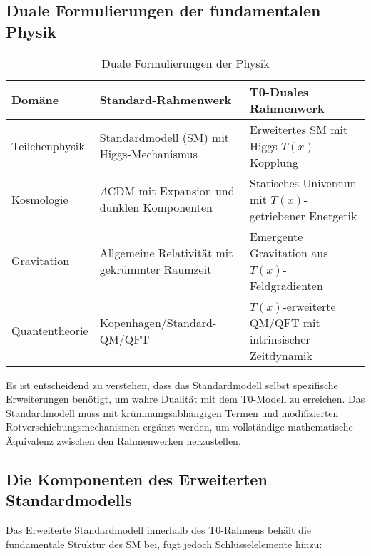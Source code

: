 \documentclass[12pt,a4paper]{article}
\newcommand{\Tfield}{T(x)}
\begin{document}
	\subsection{Duale Formulierungen der fundamentalen Physik}
	
	\begin{table}[h]
		\centering
		\begin{tabular}{>{\RaggedRight}p{} >{\RaggedRight}p{} >{\RaggedRight}p{}}
			\toprule
			\textbf{Domäne} & \textbf{Standard-Rahmenwerk} & \textbf{T0-Duales Rahmenwerk} \\
			\midrule
			Teilchenphysik & Standardmodell (SM) mit Higgs-Mechanismus & Erweitertes SM mit Higgs-$\Tfield$-Kopplung \\
			Kosmologie & $\Lambda$CDM mit Expansion und dunklen Komponenten & Statisches Universum mit $\Tfield$-getriebener Energetik \\
			Gravitation & Allgemeine Relativität mit gekrümmter Raumzeit & Emergente Gravitation aus $\Tfield$-Feldgradienten \\
			Quantentheorie & Kopenhagen/Standard-QM/QFT & $\Tfield$-erweiterte QM/QFT mit intrinsischer Zeitdynamik \\
			\bottomrule
		\end{tabular}
		\caption{Duale Formulierungen der Physik}
	\end{table}
	
	Es ist entscheidend zu verstehen, dass das Standardmodell selbst spezifische Erweiterungen benötigt, um wahre Dualität mit dem T0-Modell zu erreichen. Das Standardmodell muss mit krümmungsabhängigen Termen und modifizierten Rotverschiebungsmechanismen ergänzt werden, um vollständige mathematische Äquivalenz zwischen den Rahmenwerken herzustellen.
	
	\subsection{Die Komponenten des Erweiterten Standardmodells}
	
	Das Erweiterte Standardmodell innerhalb des T0-Rahmens behält die fundamentale Struktur des SM bei, fügt jedoch Schlüsselelemente hinzu:
	
\end{document}
